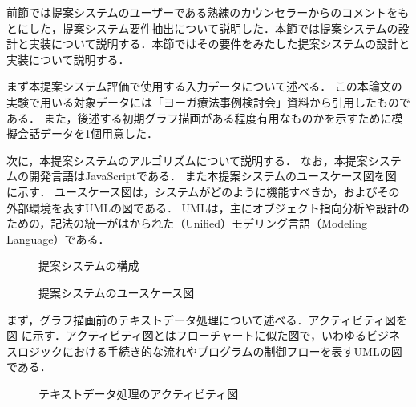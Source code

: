 \documentclass[shuuron]{kuee}
\begin{document}
前節では提案システムのユーザーである熟練のカウンセラーからのコメントをもとにした，提案システム要件抽出について説明した．本節では提案システムの設計と実装について説明する．本節ではその要件をみたした提案システムの設計と実装について説明する．



まず本提案システム評価で使用する入力データについて述べる．
この本論文の実験で用いる対象データには「ヨーガ療法事例検討会」資料から引用したものである．
また，後述する初期グラフ描画がある程度有用なものかを示すために模擬会話データを1個用意した．

次に，本提案システムのアルゴリズムについて説明する．
なお，本提案システムの開発言語はJavaScriptである．
また本提案システムのユースケース図を図
に示す．
ユースケース図は，システムがどのように機能すべきか，およびその外部環境を表すUMLの図である．
UMLは，主にオブジェクト指向分析や設計のための，記法の統一がはかられた（Unified）モデリング言語（Modeling Language）である．


\begin{figure}
   \begin{center}
   \end{center}
   \caption{提案システムの構成}
   \label{fig:4_2}
 \end{figure}

\begin{figure}
   \begin{center}
   \end{center}
   \caption{提案システムのユースケース図}
   \label{fig:use_case_diagram}
 \end{figure}


まず，グラフ描画前のテキストデータ処理について述べる．アクティビティ図を図
に示す．アクティビティ図とはフローチャートに似た図で，いわゆるビジネスロジックにおける手続き的な流れやプログラムの制御フローを表すUMLの図である．
\begin{figure}
   \begin{center}
   \end{center}
   \caption{テキストデータ処理のアクティビティ図}
   \label{fig:activity}
\end{figure}
\end{document}
